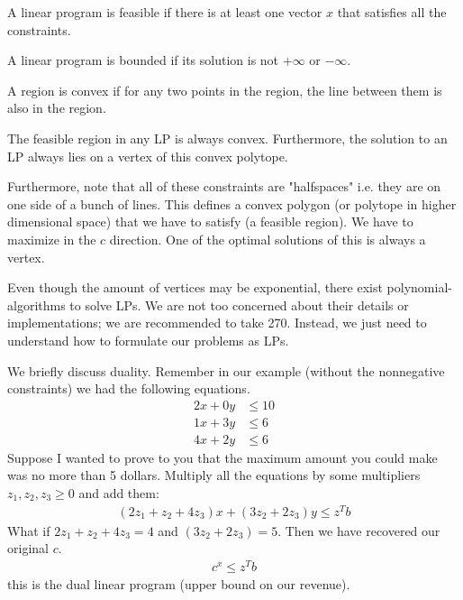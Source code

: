 \begin{definition}[Feasibility]
    A linear program is feasible if there is at least one vector $x$ that satisfies all the constraints.
\end{definition}

\begin{definition}[Bounded]
    A linear program is bounded if its solution is not $+ \infty$ or $- \infty$.
\end{definition}

\begin{definition}[Convexity]
    A region is convex if for any two points in the region, the line between them is also in the region.
\end{definition}

\begin{theorem}
    The feasible region in any LP is always convex. Furthermore, the solution to an LP always lies
    on a vertex of this convex polytope.
\end{theorem}

Furthermore, note that all of these constraints are "halfspaces" i.e. they are on one side of a bunch of lines. This defines
a convex polygon (or polytope in higher dimensional space) that we have to satisfy (a feasible region). We have to maximize in the $c$ direction. One
of the optimal solutions of this is always a vertex.

Even though the amount of vertices may be exponential, there exist polynomial-algorithms to solve LPs. We are not too
concerned about their details or implementations; we are recommended to take 270. Instead, we just need to understand how to formulate
our problems as LPs.

We briefly discuss duality. Remember in our example (without the nonnegative constraints) we had the following equations.
\begin{align*}
    2x + 0y &\leq 10 \\
    1x + 3y &\leq 6 \\ 
    4x + 2y &\leq 6
\end{align*}
Suppose I wanted to prove to you
that the maximum amount you could make was no more than 5 dollars. Multiply all the equations by some multipliers $z_1, z_2, z_3 \geq 0$ and add them:
\begin{align*}
    (2z_1 + z_2 + 4z_3)x + (3z_2 + 2z_3)y \leq z^T b
\end{align*}
What if $2z_1 + z_2 + 4z_3 = 4$ and $(3z_2 + 2z_3) = 5$. Then we have recovered our original $c$.
\begin{align*}
    c^x \leq z^T b
\end{align*}
this is the dual linear program (upper bound on our revenue).

